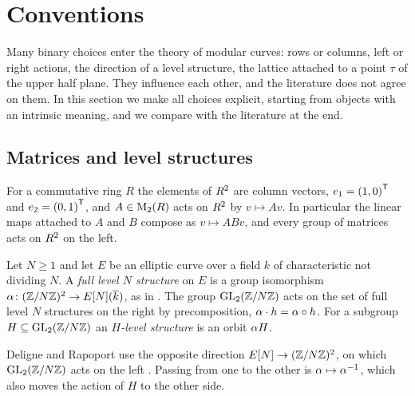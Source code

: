 \section{Conventions}\label{sec:conventions}

Many binary choices enter the theory of modular curves: rows or columns,
left or right actions, the direction of a level structure, the lattice
attached to a point $\tau$ of the upper half plane. They influence each
other, and the literature does not agree on them. In this section we make
all choices explicit, starting from objects with an intrinsic meaning,
and we compare with the literature at the end.

\subsection{Matrices and level structures}

\begin{convention}\label{conv:columns}
For a commutative ring $R$ the elements of $R^{2}$ are column
vectors, $e_{1} = {(1,0)}^{\mathsf{T}}$ and
$e_{2} = {(0,1)}^{\mathsf{T}}$, and $A \in \mathrm{M}_{2}(R)$ acts on
$R^{2}$ by $v \mapsto Av$. In particular the linear maps
attached to $A$ and $B$ compose as $v \mapsto ABv$, and every group of
matrices acts on $R^{2}$ on the left.
\end{convention}

\begin{convention}\label{conv:level}
Let $N \geq 1$ and let $E$ be an elliptic curve over a field $k$ of
characteristic not dividing $N$. A \emph{full level $N$ structure} on $E$
is a group isomorphism
$\alpha \colon (\mathbb{Z}/N\mathbb{Z})^{2} \to E[N](\overline{k})$,
as in \cite{KatzMazur1985}. The group $\GL{2}{\ResidueRing{N}}$ acts on the
set of full level $N$ structures on the right by precomposition,
$\alpha \cdot h = \alpha \circ h$. For a subgroup
$H \subseteq \GL{2}{\ResidueRing{N}}$ an \emph{$H$-level structure} is an
orbit $\alpha H$.
\end{convention}

\begin{remark}
Deligne and Rapoport use the opposite direction
$E[N] \to (\mathbb{Z}/N\mathbb{Z})^{2}$, on which
$\GL{2}{\ResidueRing{N}}$ acts on the left
\cite[IV.2.3, IV.3.1]{DeligneRapoport1973}. Passing from one to the other
is $\alpha \mapsto \alpha^{-1}$, which also moves the
action of $H$ to the other side.
\end{remark}

